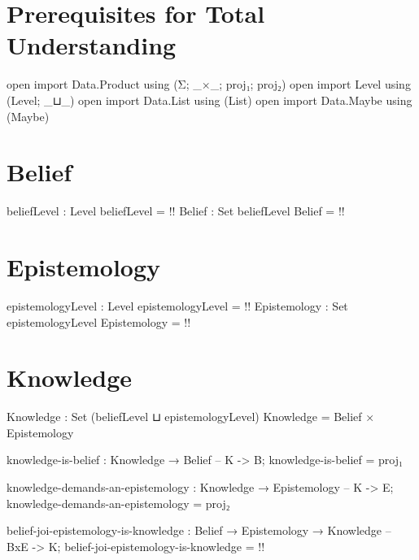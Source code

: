\documentclass{article}
\begin{document}
\section{Prerequisites for Total Understanding}

\begin{code}
open import Data.Product using (Σ; _×_; proj₁; proj₂)
open import Level using (Level; _⊔_)
open import Data.List using (List)
open import Data.Maybe using (Maybe)
\end{code}

\section{Belief}

\begin{code}
beliefLevel : Level
beliefLevel = {!!}
Belief : Set beliefLevel
Belief = {!!}
\end{code}

\section{Epistemology}

\begin{code}
epistemologyLevel : Level
epistemologyLevel = {!!}
Epistemology : Set epistemologyLevel
Epistemology = {!!}
\end{code}

\section{Knowledge}

\begin{code}
Knowledge : Set (beliefLevel ⊔ epistemologyLevel)
Knowledge = Belief × Epistemology
\end{code}

\begin{code}
knowledge-is-belief : Knowledge → Belief -- K -> B;
knowledge-is-belief = proj₁
\end{code}

\begin{code}
knowledge-demands-an-epistemology :
  Knowledge → Epistemology -- K -> E;
knowledge-demands-an-epistemology = proj₂
\end{code}

\begin{code}
belief-joi-epistemology-is-knowledge :
  Belief → Epistemology → Knowledge -- BxE -> K;
belief-joi-epistemology-is-knowledge = {!!}
\end{code}
\end{document}
